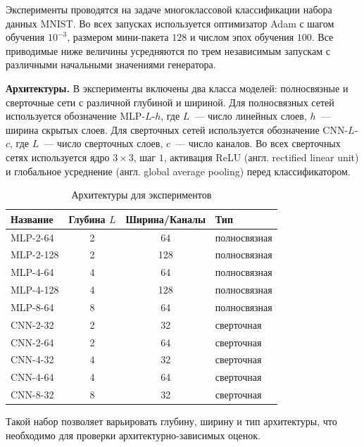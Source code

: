 Эксперименты проводятся на задаче многоклассовой классификации набора данных MNIST. Во всех запусках используется оптимизатор Adam с шагом обучения $10^{-3}$, размером мини-пакета $128$ и числом эпох обучения $100$. Все приводимые ниже величины усредняются по трем независимым запускам с различными начальными значениями генератора.

\textbf{Архитектуры.} В эксперименты включены два класса моделей: полносвязные и сверточные сети с различной глубиной и шириной. Для полносвязных сетей используется обозначение MLP-$L$-$h$, где $L$~--- число линейных слоев, $h$~--- ширина скрытых слоев. Для сверточных сетей используется обозначение CNN-$L$-$c$, где $L$~--- число сверточных слоев, $c$~--- число каналов. Во всех сверточных сетях используется ядро $3\times 3$, шаг $1$, активация ReLU (англ. rectified linear unit) и глобальное усреднение (англ. global average pooling) перед классификатором.

\begin{table}[htbp]
    \centering
    \caption{Архитектуры для экспериментов}
    \label{tab:scaling-architectures}
    \begin{SingleSpace}
        \begin{tabular}{@{}lccl@{}} 
            \toprule
            Название & Глубина $L$ & Ширина/Каналы & Тип \\
            \midrule
            MLP-2-64 & 2 & 64 & полносвязная \\
            MLP-2-128 & 2 & 128 & полносвязная \\
            MLP-4-64 & 4 & 64 & полносвязная \\
            MLP-4-128 & 4 & 128 & полносвязная \\
            MLP-8-64 & 8 & 64 & полносвязная \\
            \midrule
            CNN-2-32 & 2 & 32 & сверточная \\
            CNN-2-64 & 2 & 64 & сверточная \\
            CNN-4-32 & 4 & 32 & сверточная \\
            CNN-4-64 & 4 & 64 & сверточная \\
            CNN-8-32 & 8 & 32 & сверточная \\
            \bottomrule
        \end{tabular}
    \end{SingleSpace}
\end{table}

Такой набор позволяет варьировать глубину, ширину и тип архитектуры, что необходимо для проверки архитектурно-зависимых оценок.

